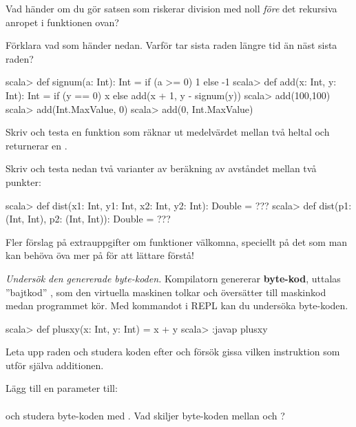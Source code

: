 \Subtask Vad händer om du gör satsen som riskerar division med noll \emph{före} det rekursiva anropet i funktionen  ovan?

\Subtask Förklara vad som händer nedan. Varför tar sista raden längre tid än näst sista raden?
\begin{REPL}
scala> def signum(a: Int): Int = if (a >= 0) 1 else -1
scala> def add(x: Int, y: Int): Int =
         if (y == 0) x else add(x + 1, y - signum(y))
scala> add(100,100)
scala> add(Int.MaxValue, 0)
scala> add(0, Int.MaxValue)
\end{REPL}



\ExtraTasks %

\Task Skriv och testa en funktion  som räknar ut medelvärdet mellan två heltal och returnerar en .

\Task Skriv och testa nedan två varianter av beräkning av avståndet mellan två punkter:
\begin{REPL}
scala> def dist(x1: Int, y1: Int, x2: Int, y2: Int): Double = ???
scala> def dist(p1: (Int, Int), p2: (Int, Int)): Double = ???
\end{REPL}

\noindent\TODO Fler förslag på extrauppgifter om funktioner välkomna, speciellt på det som man kan behöva öva mer på för att lättare förstå!




\AdvancedTasks %



\Task \emph{Undersök den genererade byte-koden.} Kompilatorn genererar \textbf{byte-kod}, uttalas ''bajtkod'' , som den virtuella maskinen tolkar och översätter till maskinkod medan programmet kör. Med kommandot  i REPL kan du undersöka byte-koden.
\begin{REPL}
scala> def plusxy(x: Int, y: Int) = x + y
scala> :javap plusxy
\end{REPL}

\Subtask Leta upp raden  och studera koden efter  och försök gissa vilken instruktion som utför själva additionen.

\Subtask Lägg till en parameter till: \\ 
\\ och studera byte-koden med . Vad skiljer byte-koden mellan  och ?

